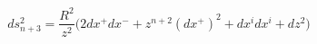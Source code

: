 \begin{equation}
\label{horo}ds^2_{n+3}=\frac{R^2}{z^2}\big(2dx^+dx^- +z^{n+2}(dx^+)^2
+dx^idx^i +dz^2\big)
\end{equation}

